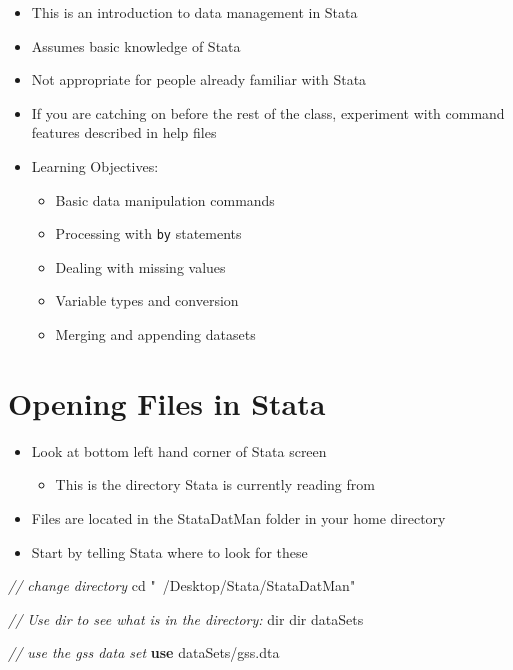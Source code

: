 \documentclass[]{book}
\newenvironment{Shaded}{\begin{snugshade}}{\end{snugshade}}
\newcommand{\CommentTok}[1]{\textcolor[rgb]{0.56,0.35,0.01}{\textit{#1}}}
\newcommand{\KeywordTok}[1]{\textcolor[rgb]{0.13,0.29,0.53}{\textbf{#1}}}
\newcommand{\NormalTok}[1]{#1}
\newcommand{\OtherTok}[1]{\textcolor[rgb]{0.56,0.35,0.01}{#1}}
\newcommand{\StringTok}[1]{\textcolor[rgb]{0.31,0.60,0.02}{#1}}
\providecommand{\tightlist}{%
  \setlength{\itemsep}{0pt}\setlength{\parskip}{0pt}}
\begin{document}
\begin{itemize}
\tightlist
\item
  This is an introduction to data management in Stata
\item
  Assumes basic knowledge of Stata
\item
  Not appropriate for people already familiar with Stata
\item
  If you are catching on before the rest of the class, experiment with command features described in help files
\item
  Learning Objectives:

  \begin{itemize}
  \tightlist
  \item
    Basic data manipulation commands
  \item
    Processing with \texttt{by} statements
  \item
    Dealing with missing values
  \item
    Variable types and conversion
  \item
    Merging and appending datasets
  \end{itemize}
\end{itemize}

\hypertarget{opening-files-in-stata}{%
\section{Opening Files in Stata}\label{opening-files-in-stata}}

\begin{itemize}
\tightlist
\item
  Look at bottom left hand corner of Stata screen

  \begin{itemize}
  \tightlist
  \item
    This is the directory Stata is currently reading from
  \end{itemize}
\item
  Files are located in the StataDatMan folder in your home directory
\item
  Start by telling Stata where to look for these
\end{itemize}

\begin{Shaded}
\begin{Highlighting}[]
  \CommentTok{// change directory}
\NormalTok{  cd }\StringTok{"~/Desktop/Stata/StataDatMan"}

  \CommentTok{// Use dir to see what is in the directory:}
  \OtherTok{dir}
  \OtherTok{dir}\NormalTok{ dataSets}

  \CommentTok{// use the gss data set}
  \KeywordTok{use}\NormalTok{ dataSets/gss.dta}
\end{Highlighting}
\end{Shaded}
\end{document}
